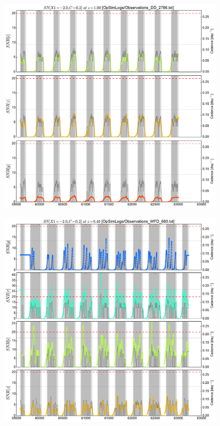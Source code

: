 \documentclass[\docopts]{\docclass}
\begin{document}
\begin{figure}[t]
  \begin{center}
    \includegraphics[width=\linewidth]{metric_DD_2786.pdf}
    \caption{}
  \end{center}
\end{figure}



\begin{figure}[t]
  \begin{center}
    \includegraphics[width=\linewidth]{metric_WFD_660.pdf}
    \caption{}
  \end{center}
\end{figure}
\end{document}
